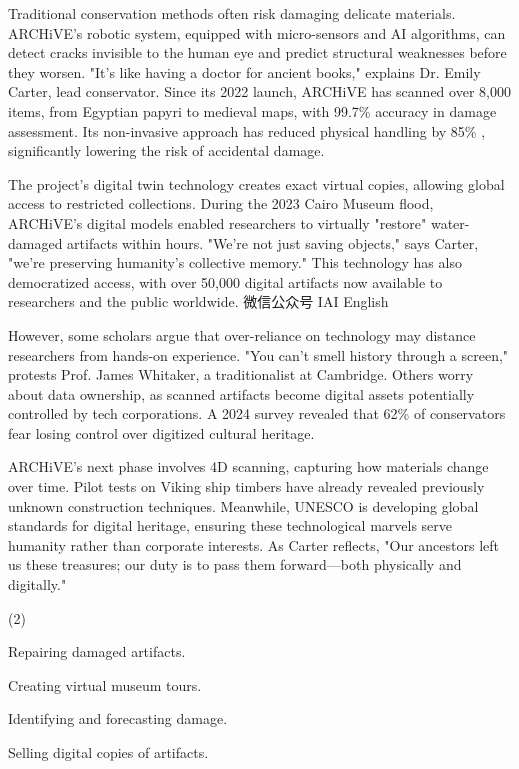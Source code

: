 \documentclass{英语试卷}
\begin{document}
\par Traditional conservation methods often risk damaging delicate materials. ARCHiVE's robotic system, equipped with micro-sensors and AI algorithms, can detect cracks invisible to the human eye and predict structural weaknesses before they worsen. "It's like having a doctor for ancient books," explains Dr. Emily Carter, lead conservator. Since its 2022 launch, ARCHiVE has scanned over 8,000 items, from Egyptian papyri to medieval maps, with 99.7\% accuracy in damage assessment. Its non-invasive approach has reduced physical handling by 85\% , significantly lowering the risk of accidental damage.\par
\par The project's digital twin technology creates exact virtual copies, allowing global access to restricted collections. During the 2023 Cairo Museum flood, ARCHiVE's digital models enabled researchers to virtually "restore" water-damaged artifacts within hours. "We’re not just saving objects," says Carter, "we’re preserving humanity’s collective memory." This technology has also democratized access, with over 50,000 digital artifacts now available to researchers and the public worldwide. 微信公众号 IAI English\par
\par However, some scholars argue that over-reliance on technology may distance researchers from hands-on experience. "You can't smell history through a screen," protests Prof. James Whitaker, a traditionalist at Cambridge. Others worry about data ownership, as scanned artifacts become digital assets potentially controlled by tech corporations. A 2024 survey revealed that 62\% of conservators fear losing control over digitized cultural heritage.\par
\par ARCHiVE's next phase involves 4D scanning, capturing how materials change over time. Pilot tests on Viking ship timbers have already revealed previously unknown construction techniques. Meanwhile, UNESCO is developing global standards for digital heritage, ensuring these technological marvels serve humanity rather than corporate interests. As Carter reflects, "Our ancestors left us these treasures; our duty is to pass them forward—both physically and digitally."\par
{}
\begin{choices}(2)
  \item Repairing damaged artifacts.
  \item Creating virtual museum tours.
  \item Identifying and forecasting damage.
  \item Selling digital copies of artifacts.
\end{choices}
\end{document}
